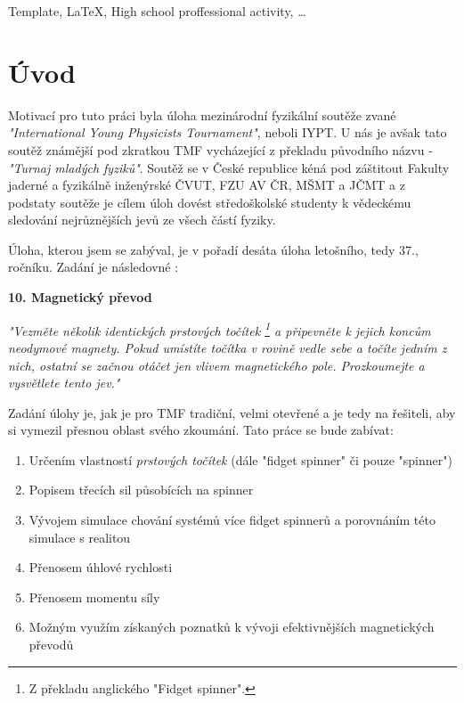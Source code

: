 \documentclass[12pt, a4paper,
 twoside,        %
 openright
]{report}
\begin{document}

\noindent Template, \LaTeX, High school proffessional activity, \dots
\cleardoublepage

\setlength{\parskip}{0pt}%
\tableofcontents
\setlength{\parskip}{12pt}%

\pagestyle{fancy}
\setcounter{page}{1}

\chapter{Úvod}
\label{chap:introduction}
Motivací pro tuto práci byla úloha mezinárodní fyzikální soutěže zvané \textit{"International Young Physicists Tournament"}, neboli IYPT.
U nás je avšak tato soutěž známější pod zkratkou TMF vycházející z překladu původního názvu - \textit{"Turnaj mladých fyziků"}.
Soutěž se v České republice kéná pod záštitout Fakulty jaderné a fyzikálně inženýrské ČVUT, FZU AV ČR, MŠMT a JČMT a z podstaty soutěže je cílem úloh dovést středoškolské studenty k vědeckému sledování nejrůznějších jevů ze všech částí fyziky.

Úloha, kterou jsem se zabýval, je v pořadí desáta úloha letošního, tedy 37., ročníku. Zadání je následovné \cite{tmf_tasks}:

\textbf{10. Magnetický převod}

\textit{"Vezměte několik identických prstových točítek \footnote{Z překladu anglického "Fidget spinner".} a připevněte k jejich koncům neodymové magnety. Pokud umístíte točítka v rovině vedle sebe a točíte jedním z nich, ostatní se začnou otáčet jen vlivem magnetického pole. Prozkoumejte a vysvětlete tento jev."}

Zadání úlohy je, jak je pro TMF tradiční, velmi otevřené a je tedy na řešiteli, aby si vymezil přesnou oblast svého zkoumání.
Tato práce se bude zabívat:

\begin{enumerate}[topsep=0pt, partopsep=0pt]
    \setlength{\itemsep}{0pt}%
    \setlength{\parskip}{0pt}%
    \item Určením vlastností \textit{prstových točítek} (dále "fidget spinner" či pouze "spinner")
    \item Popisem třecích sil působících na spinner
    \item Vývojem simulace chování systémů více fidget spinnerů a porovnáním této simulace s realitou
    \item Přenosem úhlové rychlosti
    \item Přenosem momentu síly
    \item Možným využím získaných poznatků k vývoji efektivnějších magnetických převodů
\end{enumerate}
\end{document}
